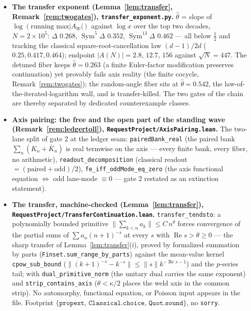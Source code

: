\documentclass[11pt]{article}
\theoremstyle{definition}
\renewcommand{\Re}{\operatorname{Re}}
\newcommand{\Sym}{\operatorname{Sym}}
\begin{document}
\begin{itemize}
\item \textbf{The transfer exponent (Lemma~\ref{lem:transfer}, Remark~\ref{rem:twogates}),
\texttt{transfer\_exponent.py}.} $\hat\theta$ = slope of $\log(\text{running max}|A_W|)$ against $\log x$
over the top two decades, $N=2\times10^{5}$: $\Delta$ $0.268$, $\Sym^5\Delta$ $0.352$, $\Sym^{13}\Delta$
$0.462$ --- all below $\tfrac12$ and tracking the classical square-root-cancellation law $(d-1)/2d$
($0.25,0.417,0.464$); endpoint $|A(N)|=2.8,\,12.7,\,156$ against $\sqrt N=447$. The detuned fiber keeps
$\hat\theta=0.263$ (a finite Euler-factor modification preserves continuation) yet provably fails axis
reality (the finite cocycle, Remark~\ref{rem:twogates}); the random-angle fiber sits at $\hat\theta=0.542$,
the law-of-the-iterated-logarithm wall, and is transfer-killed. The two gates of the chain are thereby
separated by dedicated counterexample classes.

\item \textbf{Axis pairing: the free and the open part of the standing wave
(Remark~\ref{rem:ledgertoll}), \texttt{RequestProject/AxisPairing.lean}.} The two-lane split of gate 2 at
the ledger seam: \texttt{pairedBank\_real} (the paired bank $\sum_n(K_n+\bar K_n)$ is real termwise on the
axis --- every finite bank, every fiber, no arithmetic), \texttt{readout\_decomposition} (classical readout
$=(\text{paired}+\text{odd})/2$), \texttt{fe\_iff\_oddMode\_eq\_zero} (the axis functional equation
$\Leftrightarrow$ odd lane-mode $\equiv0$ --- gate 2 restated as an extinction statement). 
\item \textbf{The transfer, machine-checked (Lemma~\ref{lem:transfer}),
\texttt{RequestProject/TransferContinuation.lean}.} \texttt{transfer\_tendsto}: a polynomially
bounded primitive $\|\sum_{k<n}a_k\|\le C\,n^{\theta}$ forces convergence of the partial sums of
$\sum a_n(n{+}1)^{-s}$ at every $s$ with $\Re s>\theta\ge0$ --- the sharp transfer of
Lemma~\ref{lem:transfer}(i), proved by formalized summation by parts
(\texttt{Finset.sum\_range\_by\_parts}) against the mean-value kernel \texttt{cpow\_sub\_bound}
($\|(k{+}1)^{-s}-k^{-s}\|\le\|s\|k^{-\Re s-1}$) and the $p$-series tail; with
\texttt{dual\_primitive\_norm} (the unitary dual carries the same exponent) and
\texttt{strip\_contains\_axis} ($\theta<\kappa/2$ places the weld axis in the common strip).
No automorphy, functional equation, or Poisson input appears in the file. Footprint
$\{\texttt{propext},\,\texttt{Classical.choice},\,\texttt{Quot.sound}\}$, no \texttt{sorry}.


\end{itemize}
\end{document}

